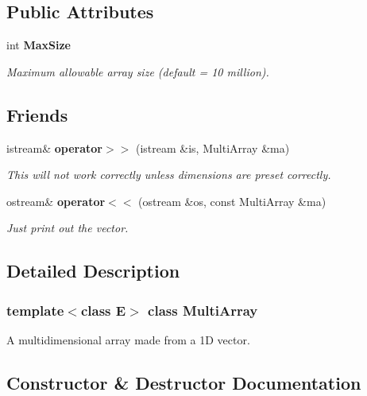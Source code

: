 \subsection*{Public Attributes}
\begin{CompactItemize}
\item 
int {\bf Max\-Size}
\begin{CompactList}\small\item\em Maximum allowable array size (default = 10 million).\item\end{CompactList}\end{CompactItemize}
\subsection*{Friends}
\begin{CompactItemize}
\item 
istream\& {\bf operator$>$$>$} (istream \&is, Multi\-Array \&ma)
\begin{CompactList}\small\item\em This will not work correctly unless dimensions are preset correctly.\item\end{CompactList}\item 
ostream\& {\bf operator$<$$<$} (ostream \&os, const Multi\-Array \&ma)
\begin{CompactList}\small\item\em Just print out the vector.\item\end{CompactList}\end{CompactItemize}


\subsection{Detailed Description}
\subsubsection*{template$<$class E$>$  class Multi\-Array}

A multidimensional array made from a 1D vector.



\subsection{Constructor \& Destructor Documentation}
